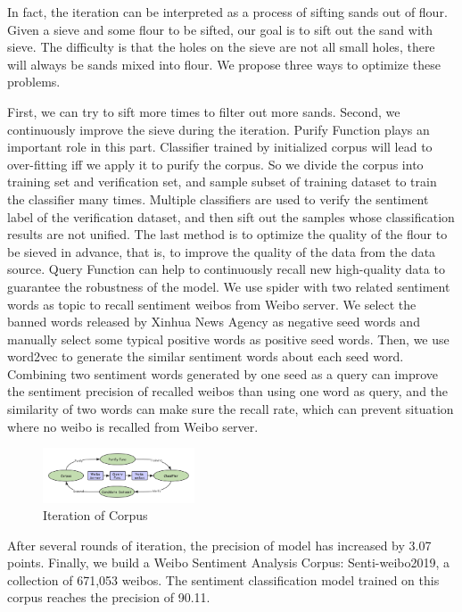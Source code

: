 \documentclass[runningheads]{llncs}
\begin{document}
In fact, the iteration can be interpreted as a process of sifting sands out of flour. Given a sieve and some flour to be sifted, our goal is to sift out the sand with sieve. The difficulty is that the holes on the sieve are not all small holes, there will always be sands mixed into flour. We propose three ways to optimize these problems. 

First, we can try to sift more times to filter out more sands. Second, we continuously improve the sieve during the iteration. Purify Function plays an important role in this part. Classifier trained by initialized corpus will lead to over-fitting iff we apply it to purify the corpus. So we divide the corpus into training set and verification set, and sample subset of training dataset to train the classifier many times. Multiple classifiers are used to verify the sentiment label of the verification dataset, and then sift out the samples whose classification results are not unified. The last method is to optimize the quality of the flour to be sieved in advance, that is, to improve the quality of the data from the data source. Query Function can help to continuously recall new high-quality data to guarantee the robustness of the model. We use spider with two related sentiment words as topic to recall sentiment weibos from Weibo server. We select the banned words released by Xinhua News Agency as negative seed words and manually select some typical positive words as positive seed words. Then, we use word2vec to generate the similar sentiment words about each seed word. Combining two sentiment words generated by one seed as a query can improve the sentiment precision of recalled weibos than using one word as query, and the similarity of two words can make sure the recall rate, which can prevent situation where no weibo is recalled from Weibo server. 

\begin{figure}[htp]
\begin{center}
\includegraphics[width=0.40\textwidth]{images/Model-Iteration-2.png}
\caption{Iteration of Corpus}
\label{fig:model-iteration}
\end{center}
\end{figure}

After several rounds of iteration, the precision of model has increased by 3.07 points. Finally, we build a Weibo Sentiment Analysis Corpus: Senti-weibo2019, a collection of 671,053 weibos. The sentiment classification model trained on this corpus reaches the precision of 90.11. 
\end{document}
